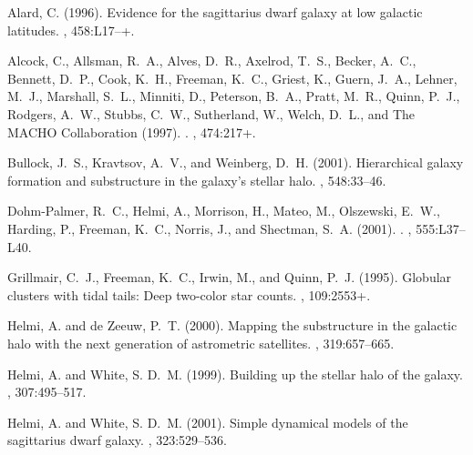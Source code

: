 %
%
\begin{thebibliography}{}

{Alard}, C. (1996).
\newblock Evidence for the sagittarius dwarf galaxy at low galactic latitudes.
\newblock {\em \apjl}, 458:L17--+.

{Alcock}, C., {Allsman}, R.~A., {Alves}, D.~R., {Axelrod}, T.~S., {Becker},
  A.~C., {Bennett}, D.~P., {Cook}, K.~H., {Freeman}, K.~C., {Griest}, K.,
  {Guern}, J.~A., {Lehner}, M.~J., {Marshall}, S.~L., {Minniti}, D.,
  {Peterson}, B.~A., {Pratt}, M.~R., {Quinn}, P.~J., {Rodgers}, A.~W.,
  {Stubbs}, C.~W., {Sutherland}, W., {Welch}, D.~L., and {The MACHO
  Collaboration} (1997).
.
\newblock {\em \apj}, 474:217+.

{Bullock}, J.~S., {Kravtsov}, A.~V., and {Weinberg}, D.~H. (2001).
\newblock Hierarchical galaxy formation and substructure in the galaxy's
  stellar halo.
\newblock {\em \apj}, 548:33--46.

{Dohm-Palmer}, R.~C., {Helmi}, A., {Morrison}, H., {Mateo}, M., {Olszewski},
  E.~W., {Harding}, P., {Freeman}, K.~C., {Norris}, J., and {Shectman}, S.~A.
  (2001).
.
\newblock {\em \apjl}, 555:L37--L40.

{Grillmair}, C.~J., {Freeman}, K.~C., {Irwin}, M., and {Quinn}, P.~J. (1995).
\newblock Globular clusters with tidal tails: Deep two-color star counts.
\newblock {\em \aj}, 109:2553+.

{Helmi}, A. and {de Zeeuw}, P.~T. (2000).
\newblock Mapping the substructure in the galactic halo with the next
  generation of astrometric satellites.
\newblock {\em \mnras}, 319:657--665.

{Helmi}, A. and {White}, S. D.~M. (1999).
\newblock Building up the stellar halo of the galaxy.
\newblock {\em \mnras}, 307:495--517.

{Helmi}, A. and {White}, S. D.~M. (2001).
\newblock Simple dynamical models of the sagittarius dwarf galaxy.
\newblock {\em \mnras}, 323:529--536.


\end{thebibliography}
